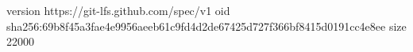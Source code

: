 version https://git-lfs.github.com/spec/v1
oid sha256:69b8f45a3fae4e9956aeeb61c9fd4d2de67425d727f366bf8415d0191cc4e8ee
size 22000
